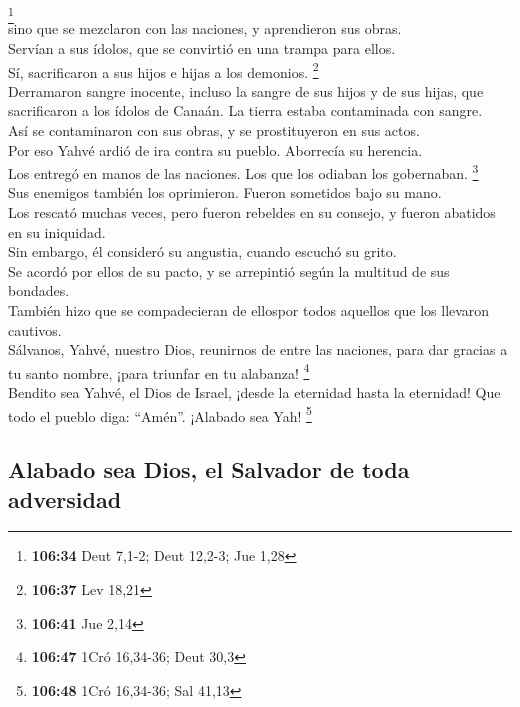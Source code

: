 \footnote{\textbf{106:34} Deut 7,1-2; Deut 12,2-3; Jue 1,28}\\
 sino que se mezclaron con las naciones, y aprendieron
sus obras.\\
 Servían a sus ídolos, que se convirtió en una trampa
para ellos.\\
 Sí, sacrificaron a sus hijos e hijas a los demonios.
\footnote{\textbf{106:37} Lev 18,21}\\
 Derramaron sangre inocente, incluso la sangre de sus
hijos y de sus hijas, que sacrificaron a los ídolos de Canaán. La tierra
estaba contaminada con sangre.\\
 Así se contaminaron con sus obras, y se prostituyeron en
sus actos.\\
 Por eso Yahvé ardió de ira contra su pueblo. Aborrecía
su herencia.\\
 Los entregó en manos de las naciones. Los que los
odiaban los gobernaban. \footnote{\textbf{106:41} Jue 2,14}\\
 Sus enemigos también los oprimieron. Fueron sometidos
bajo su mano.\\
 Los rescató muchas veces, pero fueron rebeldes en su
consejo, y fueron abatidos en su iniquidad.\\
 Sin embargo, él consideró su angustia, cuando escuchó su
grito.\\
 Se acordó por ellos de su pacto, y se arrepintió según
la multitud de sus bondades.\\
 También hizo que se compadecieran de ellospor todos
aquellos que los llevaron cautivos.\\
 Sálvanos, Yahvé, nuestro Dios, reunirnos de entre las
naciones, para dar gracias a tu santo nombre, ¡para triunfar en tu
alabanza! \footnote{\textbf{106:47} 1Cró 16,34-36; Deut 30,3}\\
 Bendito sea Yahvé, el Dios de Israel, ¡desde la
eternidad hasta la eternidad! Que todo el pueblo diga: ``Amén''.
¡Alabado sea Yah! \footnote{\textbf{106:48} 1Cró 16,34-36; Sal 41,13}

\hypertarget{alabado-sea-dios-el-salvador-de-toda-adversidad}{%
\subsection{Alabado sea Dios, el Salvador de toda
adversidad}\label{alabado-sea-dios-el-salvador-de-toda-adversidad}}


